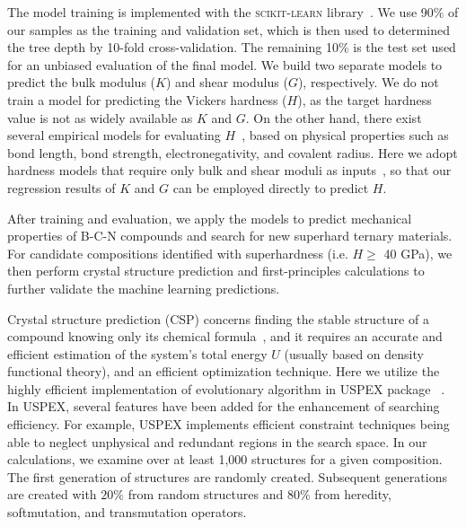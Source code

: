 	The model training is implemented with the \textsc{scikit-learn} library~\cite{scikit-learn}. We use 90$\%$ of our samples as the training and validation set, which is then used to determined the tree depth by 10-fold cross-validation. The remaining 10$\%$ is the test set used for an unbiased evaluation of the final model. We build two separate models to predict the bulk modulus ($K$) and shear modulus ($G$), respectively. We do not train a model for predicting the Vickers hardness ($H$), as the target hardness value is not as widely available as $K$ and $G$. On the other hand, there exist several empirical models for evaluating $H$~\cite{hardnessmodel2003,hardnessmodel2006,hardnessmodel2008,hardnessmodel2011,niu2019simple, mazhnik2019model}, based on physical properties such as bond length, bond strength, electronegativity, and covalent radius. Here we adopt hardness models that require only bulk and shear moduli as inputs~\cite{chen2011modeling, tian2012microscopic}, so that our regression results of $K$ and $G$ can be employed directly to predict $H$. 
	
	After training and evaluation, we apply the models to predict mechanical properties of B-C-N compounds and search for new superhard ternary materials. For candidate compositions identified with superhardness (i.e. $H \ge$ 40 GPa), we then perform crystal structure prediction and first-principles calculations to further validate the machine learning predictions.
	
	Crystal structure prediction (CSP) concerns finding the stable structure of a compound knowing only its chemical formula~\cite{wang2014perspective,graser2018machine, oganov2019structure}, and it requires an accurate and efficient estimation of the system's total energy $U$ (usually based on density functional theory), and an efficient optimization technique. Here we utilize the highly efficient implementation of evolutionary algorithm in USPEX package ~\cite{oganov2006crystal, glass2006uspex, lyakhov2013new}. In USPEX, several features have been added for the enhancement of searching efficiency. For example, USPEX implements	efficient constraint techniques being able to neglect unphysical and redundant regions in the search space. In our calculations, we examine over at least 1,000 structures for a given composition.	The first generation of structures are randomly created. Subsequent generations are created with $20\%$ from random structures and $80\%$ from heredity, softmutation, and transmutation operators.
	
